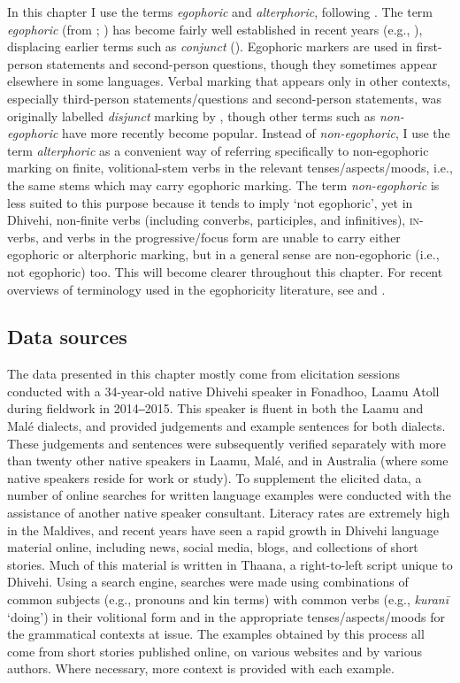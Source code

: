 \documentclass[output=paper]{langsci/langscibook}
\begin{document}
In this chapter I use the terms \textit{egophoric} and \textit{alterphoric}, following \cite{Post2013}. The term \textit{egophoric} (from \citealt{Tournadre1992}; \citeyear{Tournadre1994}) has become fairly well established in recent years (e.g., \citealt{Floydetal2018}), displacing earlier terms such as \textit{conjunct} (\citealt{Hale1980}). Egophoric markers are used in first-person statements and second-person questions, though they sometimes appear elsewhere in some languages. Verbal marking that appears only in other contexts, especially third-person statements/questions and second-person statements, was originally labelled \textit{disjunct} marking by \citeauthor{Hale1980}, though other terms such as \textit{non-egophoric} have more recently become popular. Instead of \textit{non-egophoric}, I use the term \textit{alterphoric} as a convenient way of referring specifically to non-egophoric marking on finite, volitional-stem verbs in the relevant tenses/aspects/moods, i.e., the same stems which may carry egophoric marking. The term \textit{non-egophoric} is less suited to this purpose because it tends to imply ‘not egophoric’, yet in Dhivehi, non-finite verbs (including converbs, participles, and infinitives), \textsc{in}-verbs, and verbs in the progressive/focus form are unable to carry either egophoric or alterphoric marking, but in a general sense are non-egophoric (i.e., not egophoric) too. This will become clearer throughout this chapter. For recent overviews of terminology used in the egophoricity literature, see \cite[6--9]{SanRoque2018} and \cite[35]{WidmerZemp2017}.

\subsection{Data sources}\label{s:jl1-4}

The data presented in this chapter mostly come from elicitation sessions conducted with a 34-year-old native Dhivehi speaker in Fonadhoo, Laamu Atoll during fieldwork in 2014‒2015. This speaker is fluent in both the Laamu and Malé dialects, and provided judgements and example sentences for both dialects. These judgements and sentences were subsequently verified separately with more than twenty other native speakers in Laamu, Malé, and in Australia (where some native speakers reside for work or study). 
   To supplement the elicited data, a number of online searches for written language examples were conducted with the assistance of another native speaker consultant. Literacy rates are extremely high in the Maldives, and recent years have seen a rapid growth in Dhivehi language material online, including news, social media, blogs, and collections of short stories. Much of this material is written in Thaana, a right-to-left script unique to Dhivehi. Using a search engine, searches were made using combinations of common subjects (e.g., pronouns and kin terms) with common verbs (e.g., \textit{kuranī} ‘doing’) in their volitional form and in the appropriate tenses/aspects/moods for the grammatical contexts at issue. The examples obtained by this process all come from short stories published online, on various websites and by various authors. Where necessary, more context is provided with each example. 
\end{document}
